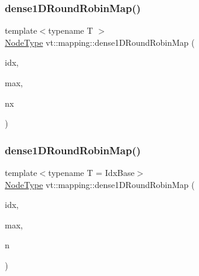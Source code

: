 \subsubsection{\texorpdfstring{dense1\+D\+Round\+Robin\+Map()}{dense1DRoundRobinMap()}\hspace{0.1cm}{\footnotesize\ttfamily [1/2]}}
{\footnotesize\ttfamily template$<$typename T $>$ \\
\hyperlink{namespacevt_a866da9d0efc19c0a1ce79e9e492f47e2}{Node\+Type} vt\+::mapping\+::dense1\+D\+Round\+Robin\+Map (\begin{DoxyParamCaption}\item[{\hyperlink{namespacevt_1_1mapping_a8b576cf2f31069778e4951f64bccafd8}{Idx1\+D\+Ptr}$<$ T $>$}]{idx,  }\item[{\mbox{[}\mbox{[}maybe\+\_\+unused\mbox{]} \mbox{]} \hyperlink{namespacevt_1_1mapping_a8b576cf2f31069778e4951f64bccafd8}{Idx1\+D\+Ptr}$<$ T $>$}]{max,  }\item[{\hyperlink{namespacevt_a866da9d0efc19c0a1ce79e9e492f47e2}{Node\+Type}}]{nx }\end{DoxyParamCaption})}

\mbox{\label{namespacevt_1_1mapping_a2a4e62c5dc17da0032d3953c7e3cde8b}} 
\subsubsection{\texorpdfstring{dense1\+D\+Round\+Robin\+Map()}{dense1DRoundRobinMap()}\hspace{0.1cm}{\footnotesize\ttfamily [2/2]}}
{\footnotesize\ttfamily template$<$typename T  = Idx\+Base$>$ \\
\hyperlink{namespacevt_a866da9d0efc19c0a1ce79e9e492f47e2}{Node\+Type} vt\+::mapping\+::dense1\+D\+Round\+Robin\+Map (\begin{DoxyParamCaption}\item[{\hyperlink{namespacevt_1_1mapping_a8b576cf2f31069778e4951f64bccafd8}{Idx1\+D\+Ptr}$<$ T $>$}]{idx,  }\item[{\hyperlink{namespacevt_1_1mapping_a8b576cf2f31069778e4951f64bccafd8}{Idx1\+D\+Ptr}$<$ T $>$}]{max,  }\item[{\hyperlink{namespacevt_a866da9d0efc19c0a1ce79e9e492f47e2}{Node\+Type}}]{n }\end{DoxyParamCaption})}

